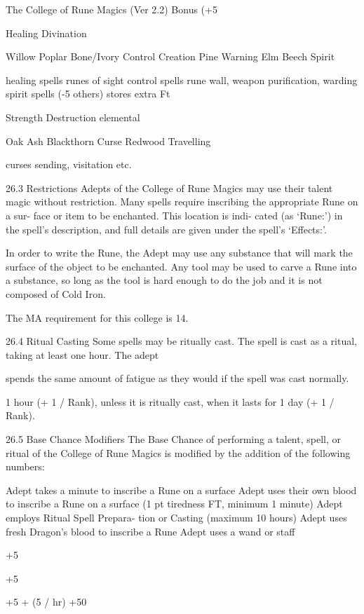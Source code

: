 \begin{Chapter}{The College of Rune Magics (Ver 2.2)}
Bonus (+5%

Healing 
Divination 

Willow 
Poplar 
Bone/Ivory  Control 
Creation 
Pine 
Warning 
Elm 
Beech 
Spirit 

healing spells  
runes of sight  
control spells 
rune wall, weapon 
purification, warding 
spirit spells (-5%
others)  
stores extra Ft 

Strength 
Destruction  elemental 

Oak 
Ash 
Blackthorn  Curse 
Redwood  Travelling 

curses 
sending, visitation etc. 

26.3 Restrictions 
Adepts  of  the  College  of  Rune  Magics  may  use 
their  talent  magic  without  restriction.  Many  spells 
require  inscribing  the  appropriate  Rune  on  a  sur-
face or item to be enchanted. This location is indi-
cated  (as  ‘Rune:’)  in  the  spell’s  description,  and 
full details are given under the spell’s ‘Effects:’. 

In order to write the Rune, the Adept may use any 
substance that will mark the surface of the object to 
be  enchanted.  Any  tool  may  be  used  to  carve  a 
Rune  into  a  substance,  so  long  as  the  tool  is  hard 
enough  to  do  the  job  and  it  is  not  composed  of 
Cold Iron. 

The MA requirement for this college is 14. 

26.4 Ritual Casting 
Some  spells  may  be  ritually  cast.  The  spell  is  cast 
as  a  ritual,  taking  at  least  one  hour.  The  adept 

spends the same amount of fatigue as they would if 
the spell was cast normally. 

1 hour (+ 1 / Rank), unless it is ritually cast, when 
it lasts for 1 day (+ 1 / Rank). 

26.5 Base Chance Modifiers 
The  Base  Chance  of  performing  a  talent,  spell,  or 
ritual  of  the  College  of  Rune  Magics  is  modified 
by the addition of the following numbers: 

Adept takes a minute to inscribe a 
Rune on a surface 
Adept uses their own blood to inscribe 
a Rune on a surface (1 pt tiredness FT, 
minimum 1 minute) 
Adept employs Ritual Spell Prepara-
tion or Casting (maximum 10 hours) 
Adept uses fresh Dragon’s blood to 
inscribe a Rune 
Adept uses a wand or staff 

+5 

+5 

+5  + (5 / 
hr) 
+50 


\end{Chapter}
